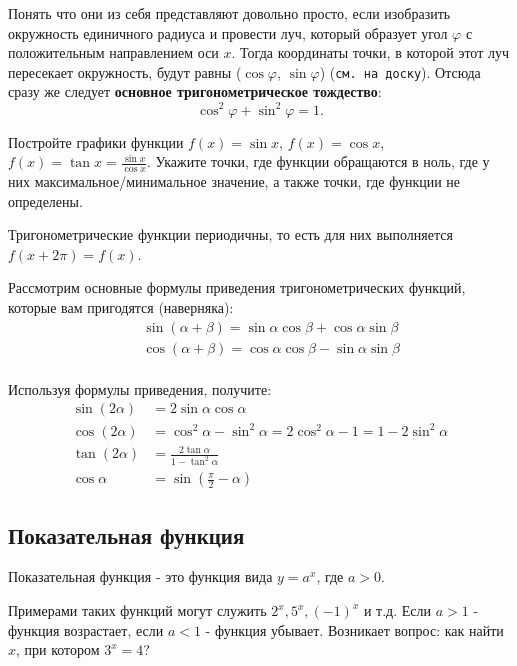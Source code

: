 Понять что они из себя представляют довольно просто, если изобразить окружность единичного радиуса и провести луч, который образует угол $\varphi$ с положительным направлением оси $x$. Тогда координаты точки, в которой этот луч пересекает окружность, будут равны ($\cos \varphi$, $\sin \varphi$) (\texttt{см. на доску}). Отсюда сразу же следует \textbf{основное тригонометрическое тождество}:
\begin{equation*}
    \cos^2 \varphi + \sin^2 \varphi = 1.
\end{equation*}
\begin{prac}
    Постройте графики функции $f(x) = \sin x$, $f(x) = \cos x$, $f(x) = \tan x = \frac{\sin x}{\cos x}$. Укажите точки, где функции обращаются в ноль, где у них максимальное/минимальное значение, а также точки, где функции не определены. 
\end{prac}
\begin{rem}
    Тригонометрические функции периодичны, то есть для них выполняется $f(x + 2\pi) = f(x)$.
\end{rem}
Рассмотрим основные формулы приведения тригонометрических функций, которые вам пригодятся (наверняка):
\begin{eqnarray*}
    && \sin(\alpha + \beta) = \sin \alpha \cos \beta + \cos \alpha \sin \beta\\
    && \cos(\alpha + \beta) = \cos \alpha \cos \beta - \sin \alpha \sin \beta\\
\end{eqnarray*}

\begin{prac}
    Используя формулы приведения, получите:
    \begin{align*}
        \sin(2\alpha) &= 2 \sin \alpha \cos \alpha\\
        \cos(2\alpha) &= \cos^2 \alpha - \sin^2 \alpha = 2\cos^2 \alpha - 1 = 1 - 2\sin^2 \alpha\\
        \tan(2\alpha) &= \frac{2\tan \alpha}{1 - \tan^2 \alpha}\\
        \cos \alpha &= \sin (\frac{\pi}{2} - \alpha)
    \end{align*}
\end{prac}
\subsection{Показательная функция}
\begin{definition}
    Показательная функция - это функция вида $y = a^x$, где $a > 0$.
\end{definition}
Примерами таких функций могут служить $2^x, 5^x, (-1)^x$ и т.д. Если $a > 1$ - функция возрастает, если $a < 1$ - функция убывает. Возникает вопрос: как найти $x$, при котором $3^x = 4$?
